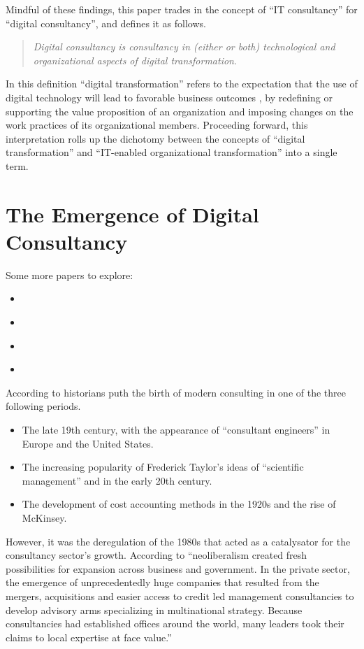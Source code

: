 \documentclass[12pt]{article}
\providecommand{\tightlist}{%
  \setlength{\itemsep}{0pt}\setlength{\parskip}{0pt}}
\begin{document}
Mindful of these findings, this paper trades in the concept of ``IT
consultancy'' for ``digital consultancy'', and defines it as follows.

\begin{quote}
\emph{Digital consultancy is consultancy in (either or both)
technological and organizational aspects of digital transformation}.
\end{quote}

In this definition ``digital transformation'' refers to the expectation
that the use of digital technology will lead to favorable business
outcomes \citep[ 104-118]{wessel2020}, by redefining or supporting the
value proposition of an organization and imposing changes on the work
practices of its organizational members. Proceeding forward, this
interpretation rolls up the dichotomy between the concepts of ``digital
transformation'' and ``IT-enabled organizational transformation'' into a
single term.

\section{The Emergence of Digital
Consultancy}\label{the-emergence-of-digital-consultancy}

Some more papers to explore:

\begin{itemize}
\tightlist
\item
  \citep{kipping2003}
\item
  \citep{kipping2012}
\item
  \citep[ 336]{fincham1999}
\item
  \citep{mckenna2006}
\end{itemize}

According to \citet[46]{mazzucato2023} historians puth the birth of
modern consulting in one of the three following periods.

\begin{itemize}
\item
  The late 19th century, with the appearance of ``consultant engineers''
  in Europe and the United States.
\item
  The increasing popularity of Frederick Taylor's ideas of ``scientific
  management'' and in the early 20th century.
\item
  The development of cost accounting methods in the 1920s and the rise
  of McKinsey.
\end{itemize}

However, it was the deregulation of the 1980s that acted as a
catalysator for the consultancy sector's growth. According to
\citet[61]{mazzucato2023} ``neoliberalism created fresh possibilities
for expansion across business and government. In the private sector, the
emergence of unprecedentedly huge companies that resulted from the
mergers, acquisitions and easier access to credit led management
consultancies to develop advisory arms specializing in multinational
strategy. Because consultancies had established offices around the
world, many leaders took their claims to local expertise at face
value.''
\end{document}
